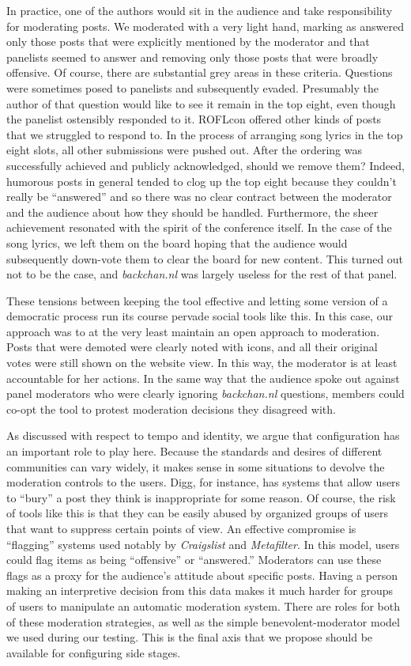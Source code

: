 In practice, one of the authors would sit in the audience and take responsibility for moderating posts. We moderated with a very light hand, marking as answered only those posts that were explicitly mentioned by the moderator and that panelists seemed to answer and removing only those posts that were broadly offensive. Of course, there are substantial grey areas in these criteria. Questions were sometimes posed to panelists and subsequently evaded. Presumably the author of that question would like to see it remain in the top eight, even though the panelist ostensibly responded to it. ROFLcon offered other kinds of posts that we struggled to respond to. In the process of arranging song lyrics in the top eight slots, all other submissions were pushed out. After the ordering was successfully achieved and publicly acknowledged, should we remove them? Indeed, humorous posts in general tended to clog up the top eight because they couldn't really be ``answered'' and so there was no clear contract between the moderator and the audience about how they should be handled. Furthermore, the sheer achievement resonated with the spirit of the conference itself. In the case of the song lyrics, we left them on the board hoping that the audience would subsequently down-vote them to clear the board for new content. This turned out not to be the case, and \emph{backchan.nl} was largely useless for the rest of that panel.

These tensions between keeping the tool effective and letting some version of a democratic process run its course pervade social tools like this. In this case, our approach was to at the very least maintain an open approach to moderation. Posts that were demoted were clearly noted with icons, and all their original votes were still shown on the website view. In this way, the moderator is at least accountable for her actions. In the same way that the audience spoke out against panel moderators who were clearly ignoring \emph{backchan.nl} questions, members could co-opt the tool to protest moderation decisions they disagreed with.

As discussed with respect to tempo and identity, we argue that configuration has an important role to play here. Because the standards and desires of different communities can vary widely, it makes sense in some situations to devolve the moderation controls to the users. Digg, for instance, has systems that allow users to ``bury'' a post they think is inappropriate for some reason. Of course, the risk of tools like this is that they can be easily abused by organized groups of users that want to suppress certain points of view. An effective compromise is ``flagging'' systems used notably by \emph{Craigslist} and \emph{Metafilter}. In this model, users could flag items as being ``offensive'' or ``answered.'' Moderators can use these flags as a proxy for the audience's attitude about specific posts. Having a person making an interpretive decision from this data makes it much harder for groups of users to manipulate an automatic moderation system. There are roles for both of these moderation strategies, as well as the simple benevolent-moderator model we used during our testing. This is the final axis that we propose should be available for configuring side stages. 


